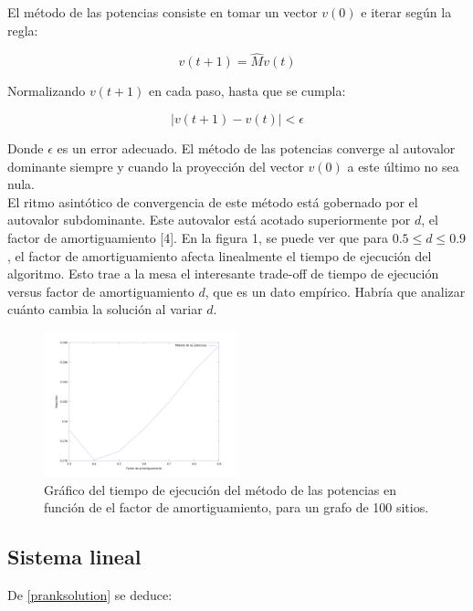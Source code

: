 \documentclass[%
    final,
    notitlepage,
    narroweqnarray,
    inline,
    twoside,
    invited
    ]{lib/ieee}
\begin{document}
El método de las potencias consiste en tomar un vector $v(0)$ e iterar según la regla:

\begin{equation}
    v(t+1) = \widehat{M}v(t)
\end{equation}

Normalizando $v(t+1)$ en cada paso, hasta que se cumpla:

\begin{equation}
    \left| v(t+1) - v(t) \right| < \epsilon
\end{equation}

Donde $\epsilon$ es un error adecuado. El método de las potencias converge al autovalor dominante siempre y cuando la proyección del
vector $v(0)$ a este último no sea nula.\\

El ritmo asintótico de convergencia de este método está gobernado por el autovalor subdominante. Este autovalor está acotado
superiormente por $d$, el factor de amortiguamiento [4]. En la figura 1, se puede ver que para $0.5 \leq d \leq 0.9$, el
factor de amortiguamiento afecta linealmente el tiempo de ejecución del algoritmo.
Esto trae a la mesa el interesante trade-off de tiempo de ejecución versus factor de amortiguamiento $d$, que es un dato empírico. Habría que
 analizar cuánto cambia la solución al variar $d$.

\begin{figure}[h!]
    \centering
    \includegraphics[width=0.5\textwidth]{img/d_pm.png} %
    \caption{Gráfico del tiempo de ejecución del método de las potencias en función de el factor de amortiguamiento, para un grafo de 100 sitios.}
\end{figure}

\subsection{Sistema lineal}

De \eqref{pranksolution} se deduce:
\end{document}
